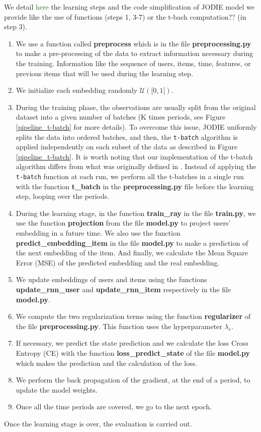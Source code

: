 We detail \textcolor{green}{here} the learning steps and the code simplification of JODIE model we provide like the use of functions (steps 1, 3-7) or the t-bach computation?? (in step 3). 
\begin{enumerate}
    \item We use a function called \textbf{preprocess} which is in the file \textbf{preprocessing.py} to make a pre-processing of the data to extract information necessary during the training. Information like the sequence of users, items, time, features, or previous items that will be used during the learning step.
    \item We initialize each embedding randomly $\mathcal{U}([0,1[)$.
    \item During the training phase, the observations are usually split from the original dataset into a given number of batches (K times periods, see Figure \ref{pipeline_t-batch} for more details). To overcome this issue, JODIE uniformly splits the data into ordered batches, and then, the \texttt{t-batch} algorithm is applied independently on each subset of the data as described in Figure \ref{pipeline_t-batch}.  It is worth noting that our implementation of the t-batch algorithm differs from what was originally defined in \cite{kumar18}. Instead of applying the \texttt{t-batch} function at each run, we perform all the t-batches in a single run with the  function \textbf{t\_batch} in the \textbf{preprocessing.py} file before the learning step, looping over the periods.
    \item During the learning stage, in the function \textbf{train\_ray} in the file \textbf{train.py}, we use the function \textbf{projection} from the file \textbf{model.py} to project users' embedding in a future time. We also use the function \textbf{predict\_embedding\_item} in the file \textbf{model.py} to make a prediction of the next embedding of the item. And finally, we calculate the Mean Square Error (MSE) of the predicted embedding and the real embedding.
    \item We update embeddings of users and items using the functions \textbf{update\_rnn\_user} and \textbf{update\_rnn\_item} respectively in the file \textbf{model.py}.
    \item We compute the two regularization terms using the function \textbf{regularizer} of the file \textbf{preprocessing.py}. This function uses the hyperparameter $\lambda_e$.
    \item If necessary, we predict the state prediction and we calculate the loss Cross Entropy (CE) with the function \textbf{loss\_predict\_state} of the file \textbf{model.py} which makes the prediction and the calculation of the loss.
    \item We perform the back propagation of the gradient, at the end of a period, to update the model weights.
    \item Once all the time periods are covered, we go to the next epoch.
\end{enumerate}
Once the learning stage is over, the evaluation is carried out.

